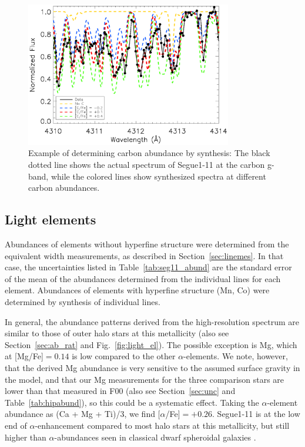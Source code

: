 \documentclass{emulateapj}
\begin{document}
\begin{figure}
 \begin{center}
  \includegraphics[width=9cm]{CH_synth.ps}
  \caption{Example of determining carbon abundance by synthesis: The black dotted line shows the actual spectrum of Segue1-11 at the carbon g-band, while the colored lines show synthesized spectra at different carbon abundances. }
  \label{fig:gband}
 \end{center}
\end{figure} 
  



\subsection{Light elements}
Abundances of elements without hyperfine structure were determined from the equivalent width measurements, as described in Section~\ref{sec:linemes}. In that case, the uncertainties listed in Table~\ref{tab:seg11_abund} are the standard error of the mean of the abundances determined from the individual lines for each element. Abundances of elements with hyperfine structure (Mn, Co) were determined by synthesis of individual lines. 

In general, the abundance patterns derived from the high-resolution spectrum are similar to those of outer halo stars at this metallicity (also see Section~\ref{sec:ab_rat} and  Fig.~\ref{fig:light_el}). The possible exception is Mg, which at [Mg/Fe]$=0.14$ is low compared to the other $\alpha$-elements. We note, however, that the derived Mg abundance is very sensitive to the assumed surface gravity in the model, and that our Mg measurements for the three comparison stars are lower than that measured in F00 (also see Section~\ref{sec:unc} and Table~\ref{tab:hipabund}), so this could be a systematic effect. Taking the $\alpha$-element abundance as (Ca + Mg + Ti)/3, we find [$\alpha$/Fe]$= +0.26 $. Segue1-11 is at the low end of $\alpha$-enhancement compared to most halo stars at this metallicity, but still higher than $\alpha$-abundances seen in classical dwarf spheroidal galaxies \citep[e.g.][]{Tolstoy2009}.
\end{document}
